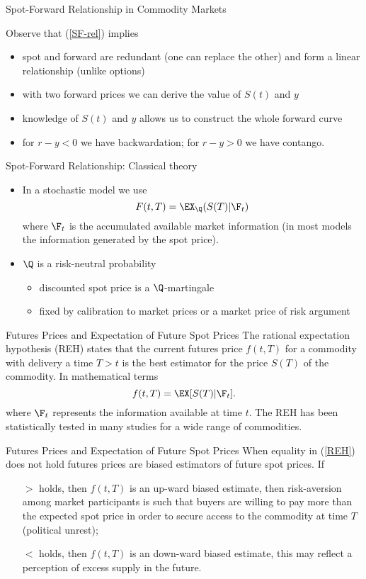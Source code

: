 {%
{Spot-Forward Relationship in Commodity Markets }

Observe that (\ref{SF-rel}) implies
\begin{itemize}
\item<1-> spot and forward are redundant (one can replace the other) and form a
linear relationship (unlike options)
\item<2-> with two forward prices we can derive the value of $S(t)$ and $y$
\item<3-> knowledge of $S(t)$ and $y$ allows us to construct the whole forward curve
\item<4-> for $r-y <0$ we have backwardation; for $r-y>0$ we have contango.
\end{itemize}

{Spot-Forward Relationship: Classical theory}
\begin{itemize}
\item<1-> In a stochastic model we use
$$
F(t,T)=\EX_{\Q}(S(T)|\F_t)
$$
where $\F_t$ is the accumulated available market information (in most models the information generated by the spot price).
\item<2-> $\Q$ is a risk-neutral probability
\begin{itemize}
\item discounted spot price is a $\Q$-martingale
\item fixed by calibration to market prices or a market price of risk argument
\end{itemize}
\end{itemize}

{Futures Prices and Expectation of Future Spot Prices}
The rational expectation hypothesis (REH) states that the current futures price $f(t,T)$ for a commodity with
delivery a time $T>t$ is the best estimator for the price $S(T)$ of the commodity.
In mathematical terms
\begin{equation}\label{REH}
f(t,T) = \EX[S(T) |\F_t].
\end{equation}
where $\F_t$ represents the information available at time $t$. The REH has been statistically
tested in many studies for a wide range of commodities.

{Futures Prices and Expectation of Future Spot Prices}
When equality in (\ref{REH}) does not hold futures prices are biased estimators of
future spot prices. If
\begin{itemize}
\item[$>$] holds, then $f(t,T)$ is an up-ward biased estimate, then risk-aversion
among market participants is such that buyers are willing to pay more than the expected
spot price in order to secure access to the commodity at time $T$ (political unrest);
\item[$<$] holds, then $f(t,T)$ is an down-ward biased estimate, this may reflect a
perception of excess supply in the future.
\end{itemize}

}
